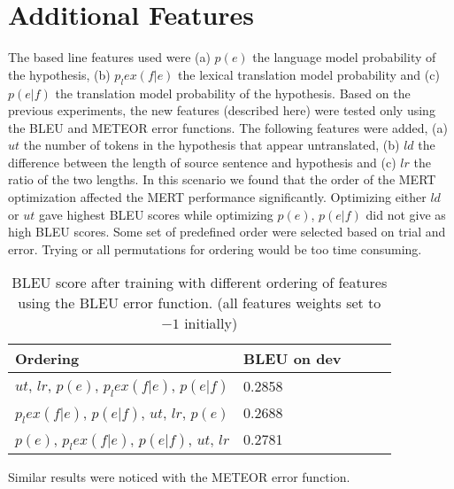 \documentclass[11pt]{article}
\begin{document}
 \section{Additional Features}
 The based line features used were (a) $p(e)$ the language model probability of
 the hypothesis, (b) $p_lex(f|e)$ the lexical translation model probability and
 (c)  $p(e|f)$ the translation model probability of the hypothesis. Based on the
 previous experiments, the new features (described here) were tested only using the
  BLEU and METEOR error functions. The following features were added, (a) $ut$ the 
  number of tokens in the hypothesis that appear untranslated, (b) $ld$ the
  difference between the length of source sentence and hypothesis and (c) $lr$ the ratio of the two lengths. In this scenario we found
 that the order of the MERT optimization affected the MERT performance
 significantly. Optimizing either $ld$ or $ut$ gave highest BLEU scores while
 optimizing $p(e)$, $p(e|f)$ did not give as high BLEU scores. Some set of
 predefined order were selected based on trial and error. Trying or all
 permutations for ordering would be too time consuming.
 \begin{table}[h]
\begin{center}
\begin{singlespace}
\begin{tabular}{|l|l|l|l|l|}
\hline \bf Ordering &  \bf BLEU on dev \\ \hline
$ut$, $lr$, $p(e)$, $p_lex(f|e)$, $p(e|f)$ & 0.2858 \\
$p_lex(f|e)$, $p(e|f)$, $ut$, $lr$, $p(e)$  & 0.2688 \\
$p(e)$, $p_lex(f|e)$, $p(e|f)$, $ut$, $lr$ & 0.2781\\
\hline
\end{tabular}
\end{singlespace}
\end{center}
\caption{ BLEU score after training with different ordering of features using
the BLEU error function. (all features weights set to $-1$ initially)}
\end{table}
Similar results were noticed with the METEOR error function.\\
\end{document}
